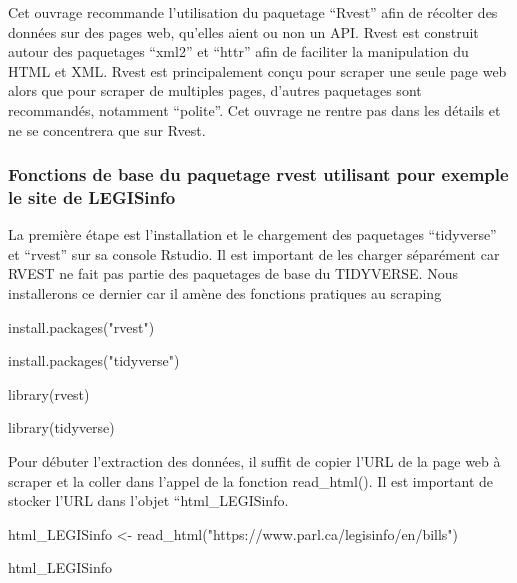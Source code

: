 \documentclass[
  letterpaper,
  DIV=11,
  numbers=noendperiod]{scrreprt}
\newenvironment{Shaded}{\begin{snugshade}}{\end{snugshade}}
\newcommand{\ErrorTok}[1]{\textcolor[rgb]{0.68,0.00,0.00}{#1}}
\newcommand{\ExtensionTok}[1]{\textcolor[rgb]{0.00,0.23,0.31}{#1}}
\newcommand{\KeywordTok}[1]{\textcolor[rgb]{0.00,0.23,0.31}{#1}}
\newcommand{\NormalTok}[1]{\textcolor[rgb]{0.00,0.23,0.31}{#1}}
\newcommand{\OperatorTok}[1]{\textcolor[rgb]{0.37,0.37,0.37}{#1}}
\newcommand{\StringTok}[1]{\textcolor[rgb]{0.13,0.47,0.30}{#1}}
\begin{document}
Cet ouvrage recommande l'utilisation du paquetage ``Rvest'' afin de
récolter des données sur des pages web, qu'elles aient ou non un API.
Rvest est construit autour des paquetages ``xml2'' et ``httr'' afin de
faciliter la manipulation du HTML et XML. Rvest est principalement conçu
pour scraper une seule page web alors que pour scraper de multiples
pages, d'autres paquetages sont recommandés, notamment ``polite''. Cet
ouvrage ne rentre pas dans les détails et ne se concentrera que sur
Rvest.

\hypertarget{fonctions-de-base-du-paquetage-rvest-utilisant-pour-exemple-le-site-de-legisinfo}{%
\subsubsection{\texorpdfstring{\textbf{Fonctions de base du paquetage
rvest utilisant pour exemple le site de
LEGISinfo}}{Fonctions de base du paquetage rvest utilisant pour exemple le site de LEGISinfo}}\label{fonctions-de-base-du-paquetage-rvest-utilisant-pour-exemple-le-site-de-legisinfo}}

La première étape est l'installation et le chargement des paquetages
``tidyverse'' et ``rvest'' sur sa console Rstudio. Il est important de
les charger séparément car RVEST ne fait pas partie des paquetages de
base du TIDYVERSE. Nous installerons ce dernier car il amène des
fonctions pratiques au scraping

\begin{Shaded}
\begin{Highlighting}[]
\ExtensionTok{install.packages}\ErrorTok{(}\StringTok{"rvest"}\KeywordTok{)}

\ExtensionTok{install.packages}\ErrorTok{(}\StringTok{"tidyverse"}\KeywordTok{)}

\ExtensionTok{library}\ErrorTok{(}\ExtensionTok{rvest}\KeywordTok{)}

\ExtensionTok{library}\ErrorTok{(}\ExtensionTok{tidyverse}\KeywordTok{)}
\end{Highlighting}
\end{Shaded}

Pour débuter l'extraction des données, il suffit de copier l'URL de la
page web à scraper et la coller dans l'appel de la fonction
read\_html(). Il est important de stocker l'URL dans l'objet
``html\_LEGISinfo.

\begin{Shaded}
\begin{Highlighting}[]
\ExtensionTok{html\_LEGISinfo} \OperatorTok{\textless{}}\NormalTok{{-} read\_html}\ErrorTok{(}\StringTok{"https://www.parl.ca/legisinfo/en/bills"}\KeywordTok{)}

\ExtensionTok{html\_LEGISinfo}
\end{Highlighting}
\end{Shaded}
\end{document}

